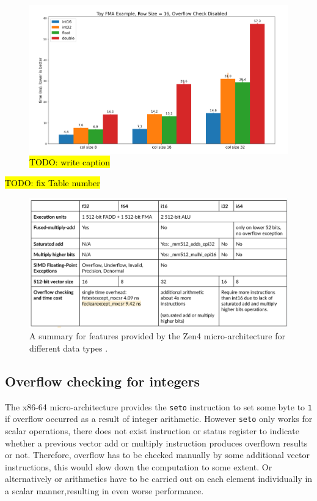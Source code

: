 \documentclass[logo,bsc,singlespacing,parskip]{infthesis}
\begin{document}
\begin{figure}[H]
    \includegraphics[width=\linewidth]{image/col8-col16-col32-i16-i32-f32-f64.png}
    \caption{\hl{TODO: write caption}}
    \label{fig:col8-col16-col32-i16-i32-f32-f64}
\end{figure}

\hl{TODO: fix Table number}
\begin{figure}[H]\captionsetup{name=Table}
    \includegraphics[width=\linewidth]{image/arch-table.png}
    \caption{A summary for features provided by the Zen4 micro-architecture
    for different data types \cite{Zen4Critique} \cite{Zen2ChipWiki}.}
    \label{archtable}
\end{figure}

\subsection{Overflow checking for integers}
\label{sec:overflow-int}

The x86-64 micro-architecture provides the \texttt{seto} instruction to set some
byte to \texttt{1} if overflow occurred as a result of integer arithmetic.
However \texttt{seto} only works for scalar operations, there does not exist
instruction or status register to indicate whether a previous vector add or
multiply instruction produces overflown results or not. Therefore, overflow has
to be checked manually by some additional vector instructions, this would slow
down the computation to some extent. Or alternatively or arithmetics have to be
carried out on each element individually in a scalar manner,resulting in even
worse performance. 
\end{document}
